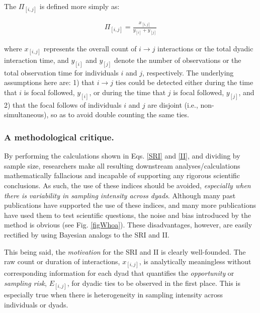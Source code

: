 \documentclass[Afour,sageh,times]{sagej}
\begin{document}
The $\Pi_{[i,j]}$ is defined more simply as: 
\begin{ceqn}
\begin{align}\label{II}
	\Pi_{[i,j]} = \frac{x_{[i,j]}} {y_{[i]} + y_{[j]}}
\end{align}
\end{ceqn}
where $x_{[i,j]}$ represents the overall count of $i\to j$ interactions or the total dyadic interaction time, and $y_{[i]}$ and $y_{[j]}$ denote the number of observations or the total observation time for individuals $i$ and $j$, respectively. The underlying assumptions here are: 1) that $i \to j$ ties could be detected either during the time that $i$ is focal followed, $y_{[i]}$, or during the time that $j$ is focal followed, $y_{[j]}$, and 2) that the focal follows of individuals $i$ and $j$ are disjoint (i.e., non-simultaneous), so as to avoid double counting the same ties. %

\subsubsection{A methodological critique.}
 By performing the calculations shown in Eqs. \ref{SRI} and \ref{II}, and dividing by sample size, researchers make all resulting downstream analyses/calculations mathematically fallacious and incapable of supporting any rigorous scientific conclusions. As such, the use of these indices should be avoided, \emph{especially when there is variability in sampling intensity across dyads}. Although many past publications have supported the use of these indices, and many more publications have used them to test scientific questions, the noise and bias introduced by the method is obvious (see Fig. \ref{figWhoa}). These disadvantages, however, are easily rectified by using Bayesian analogs to the SRI and II. 
 
 This being said, the \emph{motivation} for the SRI and II is clearly well-founded. The raw count or duration of interactions, $x_{[i,j]}$, is analytically meaningless without corresponding information for each dyad that quantifies the \emph{opportunity} or \emph{sampling risk}, $E_{[i,j]}$, for dyadic ties to be observed in the first place. This is especially true when there is heterogeneity in sampling intensity across individuals or dyads.
 
\end{document}
